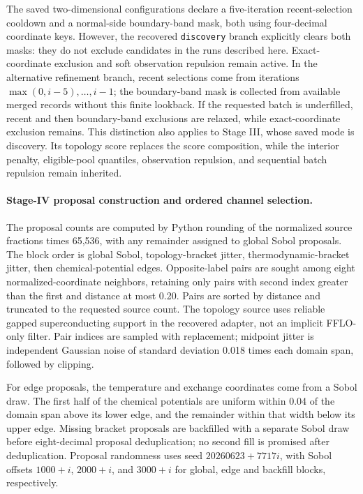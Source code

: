 The saved two-dimensional configurations declare a five-iteration recent-selection cooldown and a normal-side boundary-band mask, both using four-decimal coordinate keys. However, the recovered \texttt{discovery} branch explicitly clears both masks: they do not exclude candidates in the runs described here. Exact-coordinate exclusion and soft observation repulsion remain active. In the alternative refinement branch, recent selections come from iterations $\max(0,i-5),\ldots,i-1$; the boundary-band mask is collected from available merged records without this finite lookback. If the requested batch is underfilled, recent and then boundary-band exclusions are relaxed, while exact-coordinate exclusion remains. This distinction also applies to Stage III, whose saved mode is discovery. Its topology score replaces the score composition, while the interior penalty, eligible-pool quantiles, observation repulsion, and sequential batch repulsion remain inherited.

\paragraph{Stage-IV proposal construction and ordered channel selection.}
The proposal counts are computed by Python rounding of the normalized source fractions times 65,536, with any remainder assigned to global Sobol proposals. The block order is global Sobol, topology-bracket jitter, thermodynamic-bracket jitter, then chemical-potential edges. Opposite-label pairs are sought among eight normalized-coordinate neighbors, retaining only pairs with second index greater than the first and distance at most 0.20. Pairs are sorted by distance and truncated to the requested source count. The topology source uses reliable gapped superconducting support in the recovered adapter, not an implicit FFLO-only filter. Pair indices are sampled with replacement; midpoint jitter is independent Gaussian noise of standard deviation 0.018 times each domain span, followed by clipping.

For edge proposals, the temperature and exchange coordinates come from a Sobol draw. The first half of the chemical potentials are uniform within 0.04 of the domain span above its lower edge, and the remainder within that width below its upper edge. Missing bracket proposals are backfilled with a separate Sobol draw before eight-decimal proposal deduplication; no second fill is promised after deduplication. Proposal randomness uses seed $20260623+7717i$, with Sobol offsets $1000+i$, $2000+i$, and $3000+i$ for global, edge and backfill blocks, respectively.

